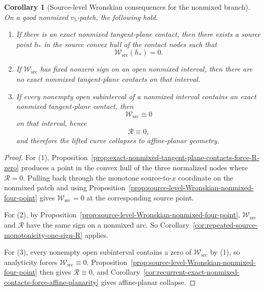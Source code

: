 \documentclass[11pt,a4paper]{amsart}
\theoremstyle{plain}
\newtheorem{corollary}[theorem]{Corollary}
\theoremstyle{definition}
\begin{document}
\begin{corollary}[Source-level Wronskian consequences for the nonmixed branch]
\label{cor:source-level-Wronskian-consequences-nonmixed}
On a good nonmixed $v_5$-patch, the following hold.

\begin{enumerate}
\item If there is an exact nonmixed tangent-plane contact, then there exists a
source point $h_*$ in the source convex hull of the contact nodes such that
\[
\mathcal W_{\mathrm{src}}(h_*)=0.
\]

\item If $\mathcal W_{\mathrm{src}}$ has fixed nonzero sign on an open
nonmixed interval, then there are no exact nonmixed tangent-plane contacts on
that interval.

\item If every nonempty open subinterval of a nonmixed interval contains an
exact nonmixed tangent-plane contact, then
\[
\mathcal W_{\mathrm{src}}\equiv 0
\]
on that interval, hence
\[
\mathcal R\equiv 0,
\]
and therefore the lifted curve collapses to affine-planar geometry.
\end{enumerate}
\end{corollary}

\begin{proof}
For (1), Proposition~\ref{prop:exact-nonmixed-tangent-plane-contacts-force-R-zero}
produces a point in the convex hull of the three normalized nodes where
$\mathcal R=0$. Pulling back through the monotone source-to-$x$ coordinate
on the nonmixed patch and using
Proposition~\ref{prop:source-level-Wronskian-nonmixed-four-point} gives
$\mathcal W_{\mathrm{src}}=0$ at the corresponding source point.

For (2), by
Proposition~\ref{prop:source-level-Wronskian-nonmixed-four-point},
$\mathcal W_{\mathrm{src}}$ and $\mathcal R$ have the same sign on a
nonmixed arc. So Corollary~\ref{cor:repeated-source-monotonicity-one-sign-R}
applies.

For (3), every nonempty open subinterval contains a zero of
$\mathcal W_{\mathrm{src}}$ by (1), so analyticity forces
$\mathcal W_{\mathrm{src}}\equiv 0$. Proposition~\ref{prop:source-level-Wronskian-nonmixed-four-point}
then gives $\mathcal R\equiv 0$, and
Corollary~\ref{cor:recurrent-exact-nonmixed-contacts-force-affine-planarity}
gives affine-planar collapse.
\end{proof}
\end{document}
